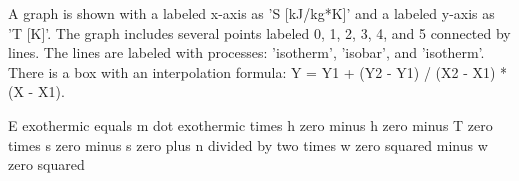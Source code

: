 A graph is shown with a labeled x-axis as 'S [kJ/kg*K]' and a labeled y-axis as 'T [K]'. The graph includes several points labeled 0, 1, 2, 3, 4, and 5 connected by lines. The lines are labeled with processes: 'isotherm', 'isobar', and 'isotherm'. There is a box with an interpolation formula: 
Y = Y1 + (Y2 - Y1) / (X2 - X1) * (X - X1).

E exothermic equals m dot exothermic times h zero minus h zero minus T zero times s zero minus s zero plus n divided by two times w zero squared minus w zero squared